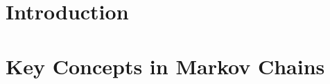 \documentclass[british,11pt,a4paper]{report}
\begin{document}
\maketitle
\tableofcontents

\chapter{Introduction}

\chapter{Key Concepts in Markov Chains}

\end{document}
